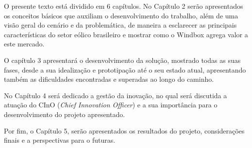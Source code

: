 O presente texto está dividido em 6 capítulos. No Capítulo 2 serão apresentados os conceitos básicos que auxiliam o desenvolvimento do trabalho, além de uma visão geral do cenário e da problemática, de maneira a esclarecer as principais características do setor eólico brasileiro e mostrar como o Windbox agrega valor a este mercado.

O capítulo 3 apresentará o desenvolvimento da solução, mostrado todas as suas fases, desde a sua idealização e prototipação até o seu estado atual, apresentando também as dificuldades encontradas e superadas ao longo do caminho.

No Capítulo 4 será dedicado a gestão da inovação, no qual será discutida a atuação do CInO (\textit{Chief Innovation Officer}) e a sua importância para o desenvolvimento do projeto apresentado.

Por fim, o Capítulo 5, serão apresentados os resultados do projeto, considerações finais e a perspectivas para o futuras.


%



